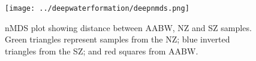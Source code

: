 \begin{figure}[!ht]
  \centering
  \texttt{[image: ../deepwaterformation/deepnmds.png]}
  \caption[\ac{nMDS} of \ac{AABW}, \ac{NZ} and \ac{SZ} samples]{\ac{nMDS} plot showing distance between \ac{AABW}, \ac{NZ} and \ac{SZ} samples.
  Green triangles represent samples from the \ac{NZ}; blue inverted triangles from the \ac{SZ}; and red squares from \ac{AABW}.}
  \label{fig:deepnmds}
\end{figure}
